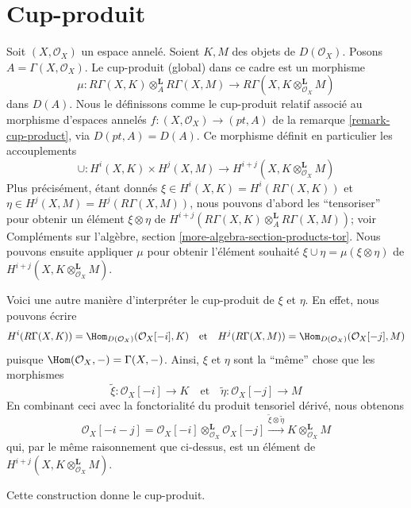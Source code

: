 \section{Cup-produit}

\label{section-cup-product}

\noindent

Soit $(X, \mathcal{O}_X)$ un espace annelé. Soient $K, M$ des objets de $D(\mathcal{O}_X)$. Posons $A = \Gamma(X, \mathcal{O}_X)$. Le cup-produit (global) dans ce cadre est un morphisme
$$
\mu :
R\Gamma(X, K) \otimes_A^\mathbf{L} R\Gamma(X, M)
\longrightarrow
R\Gamma(X, K \otimes_{\mathcal{O}_X}^\mathbf{L} M)
$$
dans $D(A)$. Nous le définissons comme le cup-produit relatif associé au morphisme d'espaces annelés $f : (X, \mathcal{O}_X) \to (pt, A)$
de la remarque \ref{remark-cup-product}, via $D(pt, A) = D(A)$. Ce morphisme définit en particulier les accouplements
$$
\cup :
H^i(X, K) \times H^j(X, M)
\longrightarrow
H^{i + j}(X, K \otimes_{\mathcal{O}_X}^\mathbf{L} M)
$$
Plus précisément, étant donnés $\xi \in H^i(X, K) = H^i(R\Gamma(X, K))$ et
$\eta \in H^j(X, M) = H^j(R\Gamma(X, M))$, nous pouvons d'abord les ``tensoriser'' pour obtenir un élément $\xi \otimes \eta$ de
$H^{i + j}(R\Gamma(X, K) \otimes_A^\mathbf{L} R\Gamma(X, M))$; voir Compléments sur l'algèbre, section \ref{more-algebra-section-products-tor}. Nous pouvons ensuite appliquer $\mu$ pour obtenir l'élément souhaité
$\xi \cup \eta = \mu(\xi \otimes \eta)$
de $H^{i + j}(X, K \otimes_{\mathcal{O}_X}^\mathbf{L} M)$.

\medskip\noindent
Voici une autre manière d'interpréter le cup-produit de $\xi$ et $\eta$. En effet, nous pouvons écrire $$
H^i(R\Gamma(X, K)) = \Hom_{D(\mathcal{O}_X)}(\mathcal{O}_X[-i], K)
\quad\text{et}\quad
H^j(R\Gamma(X, M)) = \Hom_{D(\mathcal{O}_X)}(\mathcal{O}_X[-j], M)
$$ puisque $\Hom(\mathcal{O}_X, -) = \Gamma(X, -)$. Ainsi, $\xi$ et $\eta$ sont la ``même'' chose que les morphismes $$
\tilde \xi : \mathcal{O}_X[-i] \to K
\quad\text{et}\quad
\tilde \eta : \mathcal{O}_X[-j] \to M
$$ En combinant ceci avec la fonctorialité du produit tensoriel dérivé, nous obtenons $$
\mathcal{O}_X[-i - j] =
\mathcal{O}_X[-i] \otimes_{\mathcal{O}_X}^\mathbf{L} \mathcal{O}_X[-j]
\xrightarrow{\tilde \xi \otimes \tilde \eta}
K \otimes_{\mathcal{O}_X}^\mathbf{L} M
$$ qui, par le même raisonnement que ci-dessus, est un élément de $H^{i + j}(X, K \otimes_{\mathcal{O}_X}^\mathbf{L} M)$.

\begin{lemma}

\label{lemma-second-cup-equals-first}

Cette construction donne le cup-produit.

\end{lemma}

